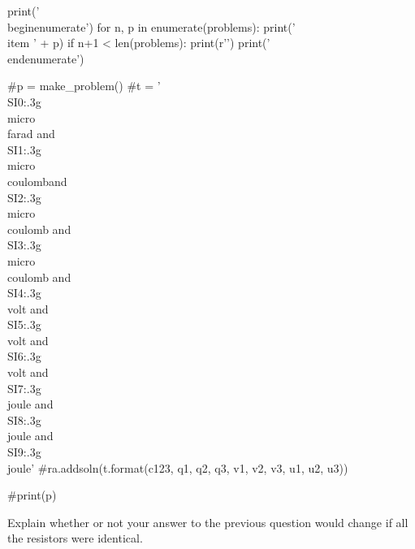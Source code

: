 \documentclass[12pt]{exam}
\begin{document}
\begin{questions}
\begin{pycode}
print('\\begin{enumerate}')
for n, p in enumerate(problems):
    print('\\item ' + p)
    if n+1 < len(problems):
        print(r'\vspace{1in}')
print('\\end{enumerate}')

#p = make_problem()
#t = '\\SI{{{0:.3g}}}{{\\micro\\farad}} and \\SI{{{1:.3g}}}{{\\micro\\coulomb}}and \\SI{{{2:.3g}}}{{\\micro\\coulomb}} and \\SI{{{3:.3g}}}{{\\micro\\coulomb}} and \\SI{{{4:.3g}}}{{\\volt}} and \\SI{{{5:.3g}}}{{\\volt}} and \\SI{{{6:.3g}}}{{\\volt}} and \\SI{{{7:.3g}}}{{\\joule}} and \\SI{{{8:.3g}}}{{\\joule}} and \\SI{{{9:.3g}}}{{\\joule}}'
#ra.addsoln(t.format(c123, q1, q2, q3, v1, v2, v3, u1, u2, u3))

#print(p)

\end{pycode}
\question Explain whether or not your answer to the previous question would change if all the resistors were identical.
\end{questions}
	
\end{document}
